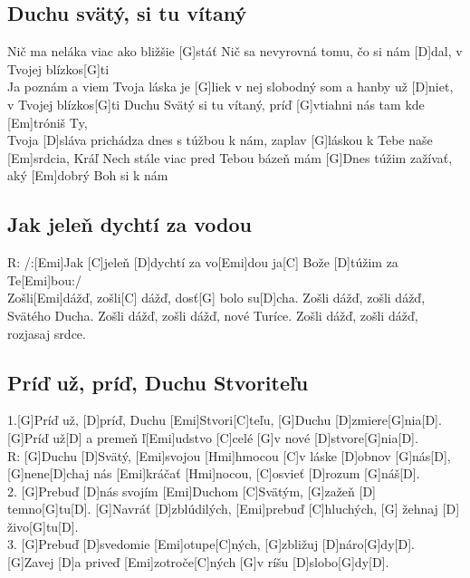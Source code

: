 \documentclass[10pt]{article}
\begin{document}
\begin{Large}
\begin{minipage}{\textwidth}
\subsection{Duchu svätý, si tu vítaný}
\begin{multicols*}{3}
\begin{guitar}	
	[D]Nič ma neláka viac
	ako bližšie [G]stáť
	Nič sa nevyrovná
	tomu, čo si nám [D]dal,
	v Tvojej blízkos[G]ti
	\\
	[D]Ja poznám a viem
	Tvoja láska je [G]liek
	v nej slobodný som
	a hanby už [D]niet,
	v Tvojej blízkos[G]ti
	\columnbreak
	[D]Duchu Svätý si tu vítaný,
	príď [G]vtiahni nás
	tam kde [Em]tróniš Ty,
	\\
	Tvoja [D]sláva prichádza dnes
	s túžbou k nám,
	zaplav [G]láskou k Tebe
	naše [Em]srdcia, Kráľ
	\columnbreak
	[D]Nech stále viac pred Tebou
	bázeň mám
	[G]Dnes túžim zažívať,
	aký [Em]dobrý Boh si k nám
\end{guitar}
\end{multicols*}
\end{minipage}

\begin{minipage}{\textwidth}
\subsection{Jak jeleň dychtí za vodou}
\begin{guitar}
	
	R: /:[Emi]Jak [C]jeleň [D]dychtí za vo[Emi]dou
	ja[C] Bože [D]túžim za Te[Emi]bou:/
	\\
	Zošli[Emi]dážď, zošli[C] dážď, dosť[G] bolo su[D]cha.
	Zošli dážď, zošli dážď, Svätého Ducha.
	Zošli dážď, zošli dážď, nové Turíce.
	Zošli dážď, zošli dážď, rozjasaj srdce.
\end{guitar}
\end{minipage}	


\begin{minipage}{\textwidth}
	\subsection{Príď už, príď, Duchu Stvoriteľu}
	\begin{guitar}
		1.[G]Príď už, [D]príď, Duchu [Emi]Stvori[C]teľu, [G]Duchu [D]zmiere[G]nia[D].
		[G]Príď už[D] a premeň ľ[Emi]udstvo [C]celé [G]v nové [D]stvore[G]nia[D].
		\\
		R: [G]Duchu [D]Svätý, [Emi]svojou [Hmi]hmocou [C]v láske [D]obnov [G]nás[D],
		[G]nene[D]chaj nás [Emi]kráčať [Hmi]nocou, [C]osvieť [D]rozum [G]náš[D].
		\\
		2. [G]Prebuď [D]nás svojím [Emi]Duchom [C]Svätým, [G]zažeň [D] temno[G]tu[D].
		[G]Navráť [D]zblúdilých, [Emi]prebuď [C]hluchých, [G] žehnaj [D] živo[G]tu[D].
		\\
		3. [G]Prebuď [D]svedomie [Emi]otupe[C]ných, [G]zbližuj [D]náro[G]dy[D].
		[G]Zavej [D]a priveď [Emi]zotroče[C]ných [G]v ríšu [D]slobo[G]dy[D].
	\end{guitar}
\end{minipage}


\end{Large}
\end{document}
